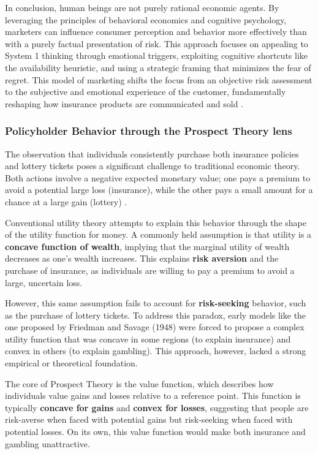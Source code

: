 \documentclass{article}
\begin{document}
In conclusion, human beings are not purely rational economic agents. By leveraging the principles of behavioral economics and cognitive psychology, marketers can influence consumer perception and behavior more effectively than with a purely factual presentation of risk. This approach focuses on appealing to System 1 thinking through emotional triggers, exploiting cognitive shortcuts like the availability heuristic, and using a strategic framing that minimizes the fear of regret. This model of marketing shifts the focus from an objective risk assessment to the subjective and emotional experience of the customer, fundamentally reshaping how insurance products are communicated and sold \cite{kahneman2011thinking}.

\subsubsection{Policyholder Behavior through the Prospect Theory lens}
The observation that individuals consistently purchase both insurance policies and lottery tickets poses a significant challenge to traditional economic theory. Both actions involve a negative expected monetary value; one pays a premium to avoid a potential large loss (insurance), while the other pays a small amount for a chance at a large gain (lottery) \cite{kahneman1979prospect}.

Conventional utility theory attempts to explain this behavior through the shape of the utility function for money. A commonly held assumption is that utility is a \textbf{concave function of wealth}, implying that the marginal utility of wealth decreases as one's wealth increases. This explains \textbf{risk aversion} and the purchase of insurance, as individuals are willing to pay a premium to avoid a large, uncertain loss.

However, this same assumption fails to account for \textbf{risk-seeking} behavior, such as the purchase of lottery tickets. To address this paradox, early models like the one proposed by Friedman and Savage (1948) were forced to propose a complex utility function that was concave in some regions (to explain insurance) and convex in others (to explain gambling). This approach, however, lacked a strong empirical or theoretical foundation.


The core of Prospect Theory is the value function, which describes how individuals value gains and losses relative to a reference point. This function is typically \textbf{concave for gains} and \textbf{convex for losses}, suggesting that people are risk-averse when faced with potential gains but risk-seeking when faced with potential losses. On its own, this value function would make both insurance and gambling unattractive.
\end{document}
